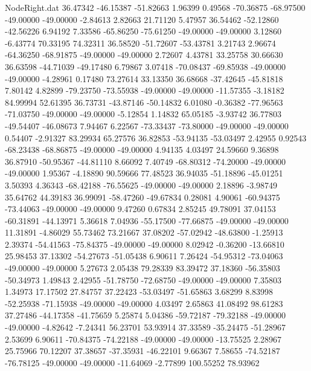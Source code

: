 \begin{filecontents}{NodeRight.dat}
  36.47342  -46.15387  -51.82663     1.96399    0.49568  -70.36875  -68.97500  -49.00000  -49.00000   -2.84613    2.82663   21.71120    5.47957
  36.54462  -52.12860  -42.56226     6.94192    7.33586  -65.86250  -75.61250  -49.00000  -49.00000    3.12860   -6.43774   70.33195   74.32311
  36.58520  -51.72607  -53.43781     3.21743    2.96674  -64.36250  -68.91875  -49.00000  -49.00000    2.72607    4.43781   33.25758   30.66630
  36.63598  -44.71039  -49.17480     6.79867    3.07418  -70.08437  -69.85938  -49.00000  -49.00000   -4.28961    0.17480   73.27614   33.13350
  36.68668  -37.42645  -45.81818     7.80142    4.82899  -79.23750  -73.55938  -49.00000  -49.00000  -11.57355   -3.18182   84.99994   52.61395
  36.73731  -43.87146  -50.14832     6.01080   -0.36382  -77.96563  -71.03750  -49.00000  -49.00000   -5.12854    1.14832   65.05185   -3.93742
  36.77803  -49.54407  -46.08673     7.94467    6.22567  -73.33437  -73.80000  -49.00000  -49.00000    0.54407   -2.91327   83.29934   65.27576
  36.82853  -53.94135  -53.03497     2.42955    0.92543  -68.23438  -68.86875  -49.00000  -49.00000    4.94135    4.03497   24.59660    9.36898
  36.87910  -50.95367  -44.81110     8.66092    7.40749  -68.80312  -74.20000  -49.00000  -49.00000    1.95367   -4.18890   90.59666   77.48523
  36.94035  -51.18896  -45.01251     3.50393    4.36343  -68.42188  -76.55625  -49.00000  -49.00000    2.18896   -3.98749   35.64762   44.39183
  36.99091  -58.47260  -49.67834     0.28081    4.90061  -60.94375  -73.44063  -49.00000  -49.00000    9.47260    0.67834    2.85245   49.78091
  37.04153  -60.31891  -44.13971     5.36618    7.04936  -55.17500  -77.66875  -49.00000  -49.00000   11.31891   -4.86029   55.73462   73.21667
  37.08202  -57.02942  -48.63800    -1.25913    2.39374  -54.41563  -75.84375  -49.00000  -49.00000    8.02942   -0.36200  -13.66810   25.98453
  37.13302  -54.27673  -51.05438     6.90611    7.26424  -54.95312  -73.04063  -49.00000  -49.00000    5.27673    2.05438   79.28339   83.39472
  37.18360  -56.35803  -50.34973     1.49843    2.42955  -51.78750  -72.68750  -49.00000  -49.00000    7.35803    1.34973   17.17502   27.84757
  37.22423  -53.03497  -51.65863     3.68299    8.83998  -52.25938  -71.15938  -49.00000  -49.00000    4.03497    2.65863   41.08492   98.61283
  37.27486  -44.17358  -41.75659     5.25874    5.04386  -59.72187  -79.32188  -49.00000  -49.00000   -4.82642   -7.24341   56.23701   53.93914
  37.33589  -35.24475  -51.28967     2.53699    6.90611  -70.84375  -74.22188  -49.00000  -49.00000  -13.75525    2.28967   25.75966   70.12207
  37.38657  -37.35931  -46.22101     9.66367    7.58655  -74.52187  -76.78125  -49.00000  -49.00000  -11.64069   -2.77899  100.55252   78.93962

\end{filecontents}
